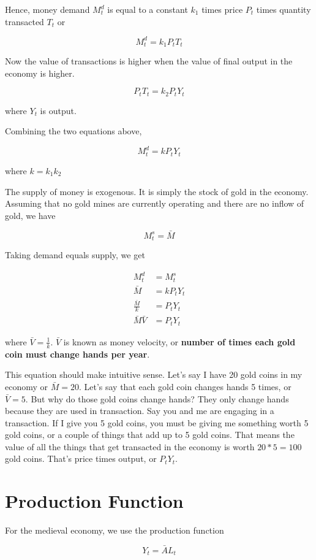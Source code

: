 \documentclass[11pt]{scrartcl}
\begin{document}
Hence, money demand $M^d_t$ is equal to a constant $k_1$ times price $P_t$ times quantity transacted $T_t$ or

\[M^d_t = k_1 P_t T_t\]

Now the value of transactions is higher when the value of final output in the economy is higher.

\[P_tT_t = k_2 P_t Y_t\] 

where $Y_t$ is output.

Combining the two equations above,

\[ M^d_t = kP_tY_t \] 

where $k=k_1k_2$

The supply of money is exogenous. It is simply the stock of gold in the economy. Assuming that no gold mines are currently operating and there are no inflow of gold, we have

\[ M^s_t = \bar{M}\]

Taking demand equals supply, we get

\begin{align*}
M^d_t &= M^s_t \\
\bar{M} &= kP_tY_t \\
\frac{\bar{M}}{k} &= P_tY_t \\
\bar{M}\bar{V} &= P_tY_t
\end{align*}

where $\bar{V} = \frac{1}{k}$. $\bar{V}$ is known as money velocity, or \textbf{number of times each gold coin must change hands per year}.

This equation should make intuitive sense. Let's say I have 20 gold coins in my economy or $\bar{M} = 20$. Let's say that each gold coin changes hands 5 times, or $\bar{V}=5$. But why do those gold coins change hands? They only change hands because they are used in transaction. Say you and me are engaging in a transaction. If I give you 5 gold coins, you must be giving me something worth 5 gold coins, or a couple of things that add up to 5 gold coins. That means the value of all the things that get transacted in the economy is worth $20*5 = 100$ gold coins. That's price times output, or $P_t Y_t$.

\section{Production Function}

For the medieval economy, we use the production function

\[Y_t = \bar{A}L_t\]
\end{document}
